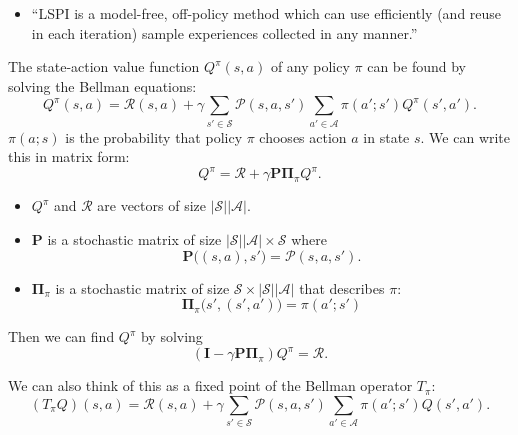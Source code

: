 \documentclass{article}
\newcommand{\abs}[1]{\left|#1\right|}
\begin{document}
\begin{itemize}
	\item ``LSPI is a model-free, off-policy method which can use efficiently (and reuse in each iteration) sample experiences collected in any manner.''
\end{itemize}

The state-action value function $Q^{\pi}(s,a)$ of any policy $\pi$ can be found by solving the Bellman equations:
\[
	Q^{\pi}(s,a)=\mathcal{R}(s,a)+\gamma\sum_{s'\in \mathcal{S}}\mathcal{P}(s,a,s')
		\sum_{a'\in \mathcal{A}}\pi(a';s')Q^{\pi}(s',a').
\]
$\pi(a;s)$ is the probability that policy $\pi$ chooses action $a$ in state $s$. We can write this in matrix form:
\[
	Q^{\pi}=\mathcal{R}+\gamma\mathbf{P}\mathbf{\Pi}_{\pi}Q^{\pi}.
\]
\begin{itemize}
	\item $Q^{\pi}$ and $\mathcal{R}$ are vectors of size $\abs{\mathcal{S}}\abs{\mathcal{A}}$.
	\item $\mathbf{P}$ is a stochastic matrix of size $\abs{\mathcal{S}}\abs{\mathcal{A}}\times \mathcal{S}$ where
		\[
			\mathbf{P}\bigl((s,a),s'\bigr)=\mathcal{P}(s,a,s').
		\]
	\item $\mathbf{\Pi}_{\pi}$ is a stochastic matrix of size $\mathcal{S}\times \abs{\mathcal{S}}\abs{\mathcal{A}}$ that describes $\pi$:
		\[
			\mathbf{\Pi}_{\pi}\bigl(s',(s',a')\bigr)=\pi(a';s')
		\]
\end{itemize}

Then we can find $Q^{\pi}$ by solving
\[
	(\mathbf{I}-\gamma \mathbf{P}\mathbf{\Pi}_{\pi})Q^{\pi}=\mathcal{R}.
\]

We can also think of this as a fixed point of the Bellman operator $T_{\pi}$:
\[
	(T_{\pi}Q)(s,a)=\mathcal{R}(s,a)+
	\gamma\sum_{s'\in \mathcal{S}}
	\mathcal{P}(s,a,s')\sum_{a'\in \mathcal{A}}
	\pi(a';s')Q(s',a').
\]
\end{document}
